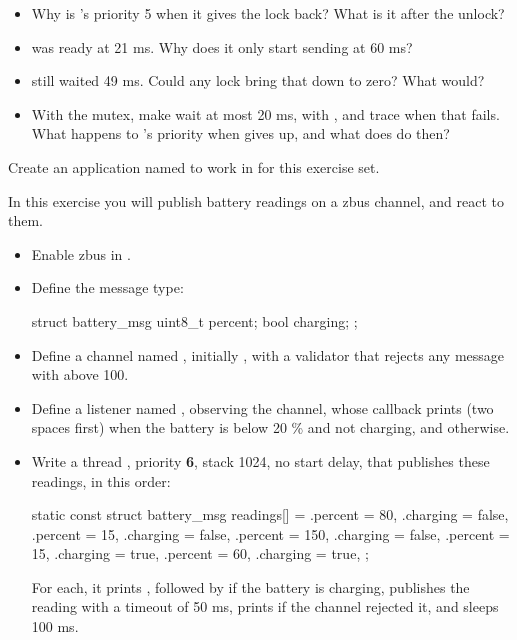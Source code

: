 \begin{itemize}
  \item Why is ’s priority 5 when it gives the lock back? What is it after the unlock?
  \item {} was ready at 21 ms. Why does it only start sending at 60 ms?
  \item {} still waited 49 ms. Could any lock bring that down to zero? What would?
  \item With the mutex, make  wait at most 20 ms, with ,
and trace  when that fails. What happens to ’s priority when
 gives up, and what does  do then?
\end{itemize}

\label{c4:set:3}
Create an application named  to work in for this exercise set.

\label{c4:ex:3.1}
In this exercise you will publish battery readings on a zbus channel, and react to them.

\begin{itemize}
  \item Enable zbus in .
  \item Define the message type:
\begin{ccode}
struct battery_msg {
  uint8_t percent;
  bool charging;
};
\end{ccode}
  \item Define a channel named , initially ,
    with a validator that rejects any message with  above 100.
  \item Define a listener named , observing the channel, whose callback prints 
    (two spaces first) when the battery is below 20 \% and not charging, and 
    otherwise.
  \item Write a thread , priority \textbf{6}, stack 1024, no start delay, that publishes these
    readings, in this order:
\begin{ccode}
static const struct battery_msg readings[] = {
  {.percent = 80, .charging = false}, {.percent = 15, .charging = false},
  {.percent = 150, .charging = false}, {.percent = 15, .charging = true},
  {.percent = 60, .charging = true},
};
\end{ccode}

\noindent For each, it prints , followed by  if the
battery is charging, publishes the reading with a timeout of 50 ms, prints  if
the channel rejected it, and sleeps 100 ms.
\end{itemize}

